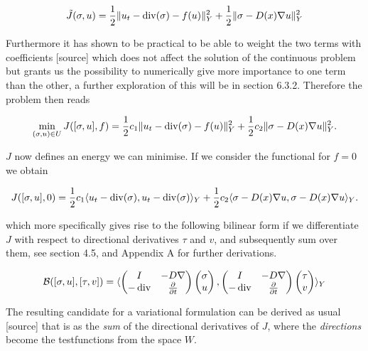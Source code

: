 \documentclass[../draft_1.tex]{subfiles}
\begin{document}
\begin{ceqn}
\begin{align}
\tilde{J}(\sigma, u) =\frac{1}{2}\| u_t - \mathop{}\!\mathrm{div}(\sigma) - f(u) \|_Y^2 + \frac{1}{2}\| \sigma - D(x) \nabla u \| _Y^2
\end{align}
\end{ceqn}
Furthermore it has shown to be practical to be able to weight the two terms with coefficients [source] which does not affect the solution of the continuous problem but grants us the possibility to numerically give more importance to one term than the other, a further exploration of this will be in section 6.3.2. Therefore the problem then reads
\begin{ceqn}
	\begin{align}
	\label{functional}
  \min_{(\sigma, u) \in U} J([\sigma, u], f) = \frac{1}{2} c_1 \| u_t - \mathop{}\!\mathrm{div}(\sigma) - f(u) \|_Y^2 + \frac{1}{2} c_2 \| \sigma - D(x) \nabla u \|_Y^2.
	\end{align}
\end{ceqn}
$J$ now defines an energy we can minimise. If we consider the functional for $ f = 0$ we obtain
\begin{ceqn}
	\begin{align}
J([\sigma, u], 0) = \frac{1}{2} c_1 \langle u_t - \mathop{}\!\mathrm{div}(\sigma), u_t - \mathop{}\!\mathrm{div}(\sigma)\rangle_Y + \frac{1}{2} c_2 \langle \sigma - D(x) \nabla u, \sigma - D(x) \nabla u \rangle_Y.
	\end{align}
\end{ceqn}
which more specifically gives rise to the following bilinear form if we differentiate $J$ with respect to directional derivatives $\tau$ and $v$, and subsequently sum over them, see section 4.5, and Appendix A for further derivations. 
\begin{ceqn}
	\begin{equation}
	\begin{aligned}
	\mathcal{B} ([\sigma, u], [\tau, v]) = \langle \begin{pmatrix} 
	I & - D \nabla \\
	-\mathop{}\!\mathrm{div} & \frac{\partial}{\partial t}
	\end{pmatrix} 
	\begin{pmatrix}
	\sigma \\
	u
	\end{pmatrix}, 
	\begin{pmatrix}
	I & - D \nabla \\
	-\mathop{}\!\mathrm{div} & \frac{\partial}{\partial t}
	\end{pmatrix}
	\begin{pmatrix}
	\tau \\
	v
	\end{pmatrix} \rangle_Y
	\end{aligned}
	\end{equation}
\end{ceqn}
The resulting candidate for a variational formulation can be derived as usual [source] that is as the \textit{sum} of the directional derivatives of $J$, where the \textit{directions} become the testfunctions from the space $W$.
\end{document}

